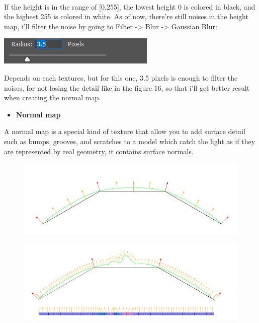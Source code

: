 \documentclass[a4paper, 13pt]{extarticle}
\begin{document}
  \\[0.2cm]
  If the height is in the range of [0,255], the lowest height 0 is colored in black, and the highest 255 is colored in white. As of now, there're still noises in the height map, i'll filter the noise by going to Filter -> Blur -> Gaussian Blur: \begin{minipage}{0.21\textwidth}
  	\includegraphics[width=\linewidth]{intructions/guassian_blur.png}
  \end{minipage}  Depends on each textures, but for this one, 3.5 pixels is enough to filter the noises, for not losing the detail like in the figure 16, so that i'll get better result when creating the normal map.  
\begin{itemize}
	\item \bfseries Normal map	 	
\end{itemize}
  A normal map is a special kind of texture that allow you to add surface detail such as bumps, grooves, and scratches to a model which catch the light as if they are represented by real geometry, it contains surface normals. 
  \begin{figure}[h]
  	\begin{minipage}{.45\textwidth}
  		\centering
  		\includegraphics[width=1\linewidth]{intructions/surface_normal.png}
  		\centering
  		\label{fig:test18}
  	\end{minipage}
  	\begin{minipage}{.4\textwidth}
  		\centering
  		\includegraphics[width=1.6\linewidth]{intructions/surface_normal_across.png}
  		\centering
  		\label{fig:test179}
  	\end{minipage}
  \end{figure}
\end{document}

